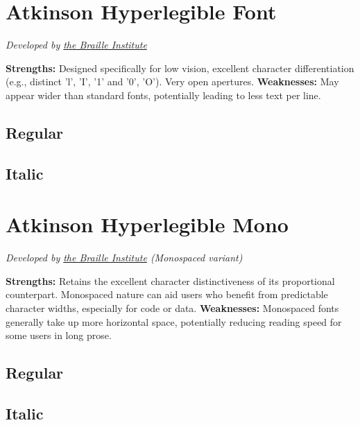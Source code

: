 \section{Atkinson Hyperlegible Font}\label{trouble6}
\emph{Developed by \href{https://brailleinstitute.org/freefont}{the Braille Institute}}
\begin{raggedright}
\textbf{Strengths:} Designed specifically for low vision, excellent character differentiation (e.g., distinct 'l', 'I', '1' and '0', 'O'). Very open apertures.
\textbf{Weaknesses:} May appear wider than standard fonts, potentially leading to less text per line.

\subsection{Regular}
\FontSample{\atkinsonhyperlegiblefont}

\subsection{Italic}
\FontSample{{\atkinsonhyperlegiblefont\itshape}}
\end{raggedright}


\pagebreak
\section{Atkinson Hyperlegible Mono}\label{troubleAtkinsonMono}
\emph{Developed by \href{https://brailleinstitute.org/freefont}{the Braille Institute} (Monospaced variant)}
\begin{raggedright}
\textbf{Strengths:} Retains the excellent character distinctiveness of its proportional counterpart. Monospaced nature can aid users who benefit from predictable character widths, especially for code or data.
\textbf{Weaknesses:} Monospaced fonts generally take up more horizontal space, potentially reducing reading speed for some users in long prose.

\subsection{Regular}
\FontSample{\atkinsonmonofont}

\subsection{Italic}
\FontSample{{\atkinsonmonofont\itshape}}
\end{raggedright}



